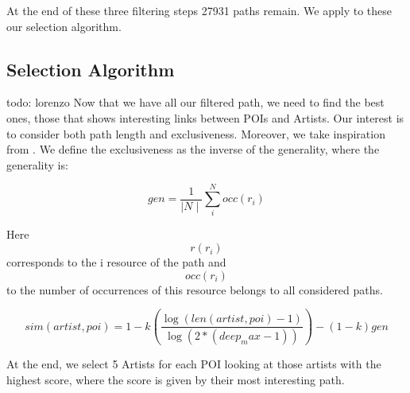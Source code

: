 \documentclass[paper=a4, fontsize=11pt]{scrartcl}
\begin{document}
At the end of these three filtering steps 27931 paths remain. We apply to these our selection algorithm.


\subsection{Selection Algorithm}
todo: lorenzo
Now that we have all our filtered path, we need to find the best ones, those that shows interesting links between POIs and Artists. Our interest is to consider both path length and exclusiveness. 
Moreover, we take inspiration from \cite{meng2013review}.
We define the exclusiveness as the inverse of the generality, where the generality is:

$$gen =\frac{1}{\mid N \mid}\sum_i^Nocc(r_{i})$$

Here $$r(r_{i})$$ corresponds to the i resource of the path and $$occ(r_{i})$$ to the number of occurrences of this resource belongs to all considered paths.

$$sim(artist,poi) = 1-k(\frac{\log(len(artist,poi)-1)}{\log(2*(deep_max -1))})-(1-k)gen$$



At the end, we select 5 Artists for each POI looking at those artists with the highest score, where the score is given by their most interesting path.
\end{document}
